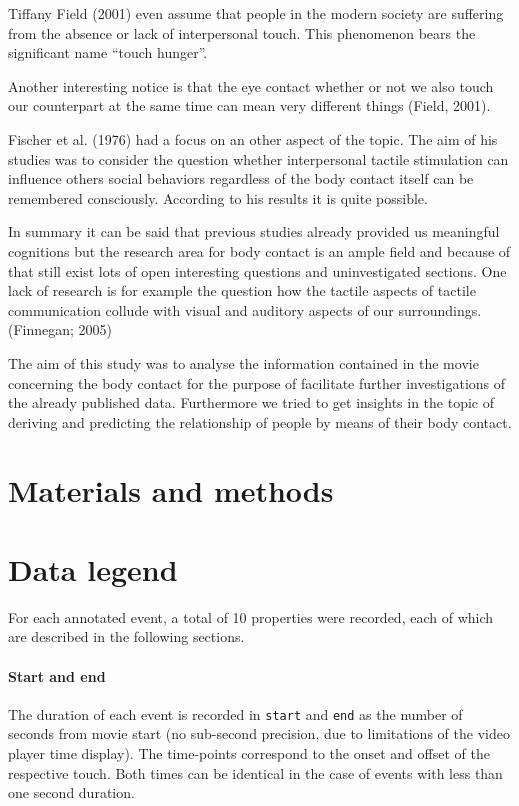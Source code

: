 \documentclass[10pt,a4paper,twocolumn]{article}
\begin{document}
Tiffany Field (2001) even assume that people in the modern society are
suffering from the absence or lack of interpersonal touch. This phenomenon
bears the significant name “touch hunger”.

Another interesting notice is that the eye contact whether or not we also touch
our counterpart at the same time can mean very different  things (Field, 2001).

Fischer et al. (1976) had a focus on an other aspect of the topic. The aim of
his studies was to consider the question whether interpersonal tactile
stimulation can influence others social behaviors regardless of the body
contact itself can be remembered consciously. According to his results it is
quite possible.

In summary it can be said that previous studies already provided us meaningful
cognitions but the research area for body contact is an ample field and because
of that still exist lots of open interesting questions and uninvestigated
sections.  One lack of research is for example the question how the tactile
aspects of tactile communication collude with visual and auditory aspects of
our surroundings. (Finnegan; 2005)

The aim of this study was to analyse the information contained in the movie
concerning the body contact for the purpose of facilitate further
investigations of the already published data. Furthermore we tried to get
insights in the topic of deriving and predicting the relationship of people by
means of their body contact.


\section*{Materials and methods}

\section*{Data legend}

For each annotated event, a total of 10 properties were recorded, each of which
are described in the following sections.

\paragraph{Start and end} The duration of each event is recorded in
\texttt{start} and \texttt{end} as the number of seconds from movie start (no
sub-second precision, due to limitations of the video player time display). The
time-points correspond to the onset and offset of the respective touch. Both
times can be identical in the case of events with less than one second duration.
\end{document}

